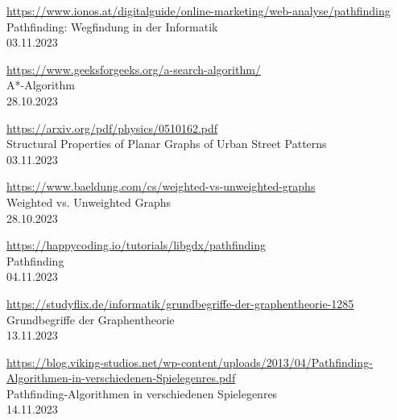 \begin{thebibliography}{999}
    
    \href{https://www.ionos.at/digitalguide/online-marketing/web-analyse/pathfinding}{https://www.ionos.at/digitalguide/online-marketing/web-analyse/pathfinding}\\
    Pathfinding: Wegfindung in der Informatik\\
    03.11.2023
    
    \href{https://www.geeksforgeeks.org/a-search-algorithm/}{https://www.geeksforgeeks.org/a-search-algorithm/}\\
    A*-Algorithm\\
    28.10.2023
    
    \href{https://arxiv.org/pdf/physics/0510162.pdf}{https://arxiv.org/pdf/physics/0510162.pdf}\\
    Structural Properties of Planar Graphs of Urban Street Patterns\\
    03.11.2023
    
    \href{https://www.baeldung.com/cs/weighted-vs-unweighted-graphs}{https://www.baeldung.com/cs/weighted-vs-unweighted-graphs}\\
    Weighted vs. Unweighted Graphs\\
    28.10.2023
    
    \href{https://happycoding.io/tutorials/libgdx/pathfinding}{https://happycoding.io/tutorials/libgdx/pathfinding}\\
    Pathfinding\\
    04.11.2023
    
    \href{https://studyflix.de/informatik/grundbegriffe-der-graphentheorie-1285}{https://studyflix.de/informatik/grundbegriffe-der-graphentheorie-1285}\\
    Grundbegriffe der Graphentheorie\\
    13.11.2023
    
    \href{https://blog.viking-studios.net/wp-content/uploads/2013/04/Pathfinding-Algorithmen-in-verschiedenen-Spielegenres.pdf}{https://blog.viking-studios.net/wp-content/uploads/2013/04/Pathfinding-Algorithmen-in-verschiedenen-Spielegenres.pdf}\\
    Pathfinding-Algorithmen in verschiedenen Spielegenres\\
    14.11.2023
    

\end{thebibliography}
